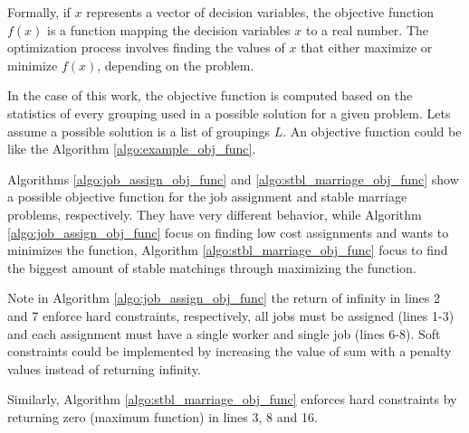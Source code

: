             Formally, if \( x \) represents a vector of decision variables, the objective function \( f(x) \) is a function mapping the decision variables \( x \) to a real number. The optimization process involves finding the values of \( x \) that either maximize or minimize \( f(x) \), depending on the problem.
            
            In the case of this work, the objective function is computed based on the statistics of every grouping used in a possible solution for a given problem.
            Lets assume a possible solution is a list of groupings $L$. An objective function could be like the Algorithm \ref{algo:example_obj_func}.

            

            Algorithms \ref{algo:job_assign_obj_func} and \ref{algo:stbl_marriage_obj_func} show a possible objective function for the job assignment and stable marriage problems, respectively. They have very different behavior, while Algorithm \ref{algo:job_assign_obj_func} focus on finding low cost assignments and wants to minimizes the function, Algorithm \ref{algo:stbl_marriage_obj_func} focus to find the biggest amount of stable matchings through maximizing the function.

            
            

            Note in Algorithm \ref{algo:job_assign_obj_func} the return of infinity in lines 2 and 7 enforce hard constraints, respectively, all jobs must be assigned (lines 1-3) and each assignment must have a single worker and single job (lines 6-8). Soft constraints could be implemented by increasing the value of sum with a penalty values instead of returning infinity.

            Similarly, Algorithm \ref{algo:stbl_marriage_obj_func} enforces hard constraints by returning zero (maximum function) in lines 3, 8 and 16.
    
